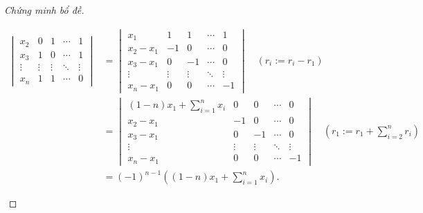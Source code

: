 \documentclass[class=linear-algebra,crop=false]{standalone}
\begin{document}
\begin{proof}[Chứng minh bổ đề]
\begin{enumerate}[label = (\roman*)]
\begin{align*}
\begin{vmatrix}
				      x_{2}  & 0      & 1      & \cdots & 1      \\
				      x_{3}  & 1      & 0      & \cdots & 1      \\
				      \vdots & \vdots & \vdots & \ddots & \vdots \\
				      x_{n}  & 1      & 1      & \cdots & 0
			      \end{vmatrix}
			       & =
			      \begin{vmatrix}
				      x_{1}         & 1      & 1      & \cdots & 1      \\
				      x_{2} - x_{1} & -1     & 0      & \cdots & 0      \\
				      x_{3} - x_{1} & 0      & -1     & \cdots & 0      \\
				      \vdots        & \vdots & \vdots & \ddots & \vdots \\
				      x_{n} - x_{1} & 0      & 0      & \cdots & -1
			      \end{vmatrix}\quad(r_{i}:= r_{i} - r_{1})                                 \\
			       & =
			      \begin{vmatrix}
				      (1-n)x_{1} + \displaystyle\sum^{n}_{i=1}x_{i} & 0      & 0      & \cdots & 0      \\
				      x_{2} - x_{1}                                 & -1     & 0      & \cdots & 0      \\
				      x_{3} - x_{1}                                 & 0      & -1     & \cdots & 0      \\
				      \vdots                                        & \vdots & \vdots & \ddots & \vdots \\
				      x_{n} - x_{1}                                 & 0      & 0      & \cdots & -1
			      \end{vmatrix}\quad(r_{1}:= r_{1} + \sum^{n}_{i=2}r_{i}) \\
			       & = {(-1)}^{n-1}\left((1-n)x_{1} + \sum^{n}_{i=1}x_{i}\right).
		      \end{align*}
		      \endgroup{}


\end{enumerate}
\end{proof}
\end{document}
